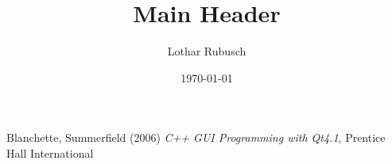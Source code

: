 \documentclass[a4paper,10pt]{scrartcl}
\title{Main Header}
\author{Lothar Rubusch}
\date{\today}
\begin{document}
\sffamily

\maketitle

\parindent0mm


\cite[S.xy]{Qt06}

\appendix

\begin{thebibliography}{99}
  Blanchette, Summerfield (2006) {\em C++ GUI Programming with Qt4.1},  Prentice Hall International
 
\end{thebibliography}
\end{document}
